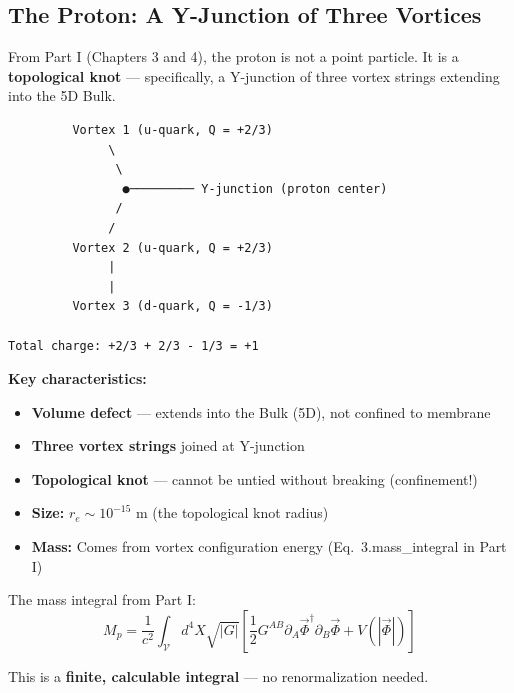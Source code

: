 \subsection{The Proton: A Y-Junction of Three Vortices}
\label{subsec:proton_structure}

From Part I (Chapters 3 and 4), the proton is not a point particle. It is a \textbf{topological knot} --- specifically, a Y-junction of three vortex strings extending into the 5D Bulk.

\begin{tcolorbox}[colback=blue!5,colframe=blue!70,title=\textbf{Proton Structure}]
\begin{verbatim}
         Vortex 1 (u-quark, Q = +2/3)
              \
               \
                ●───────── Y-junction (proton center)
               /
              /
         Vortex 2 (u-quark, Q = +2/3)
              |
              |
         Vortex 3 (d-quark, Q = -1/3)

Total charge: +2/3 + 2/3 - 1/3 = +1
\end{verbatim}
\end{tcolorbox}

\textbf{Key characteristics:}
\begin{itemize}
    \item \textbf{Volume defect} --- extends into the Bulk (5D), not confined to membrane
    \item \textbf{Three vortex strings} joined at Y-junction
    \item \textbf{Topological knot} --- cannot be untied without breaking (confinement!)
    \item \textbf{Size:} $r_e \sim 10^{-15}$ m (the topological knot radius)
    \item \textbf{Mass:} Comes from vortex configuration energy (Eq.~3.mass\_integral in Part I)
\end{itemize}

The mass integral from Part I:
\begin{equation}
M_p = \frac{1}{c^2} \int_{\mathcal{V}} d^4X \sqrt{|G|} \left[ \frac{1}{2} G^{AB} \partial_A \vec{\Phi}^\dagger \partial_B \vec{\Phi} + V(|\vec{\Phi}|) \right]
\label{eq:proton_mass}
\end{equation}

This is a \textbf{finite, calculable integral} --- no renormalization needed.

